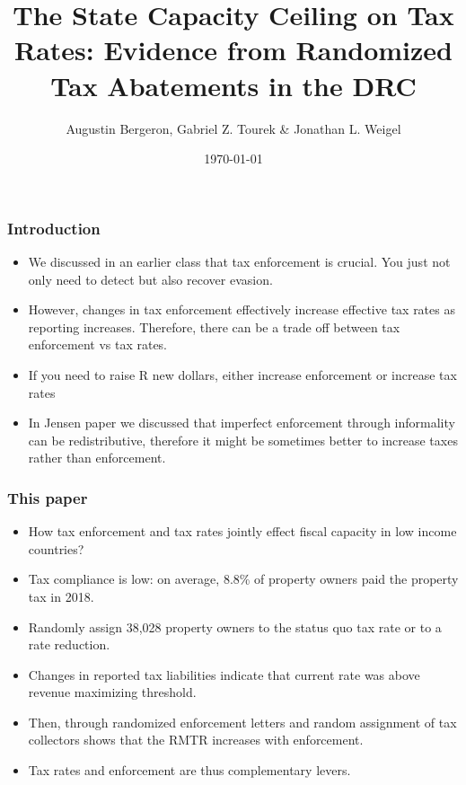 \documentclass{beamer}
\begin{document}
\title{The State Capacity Ceiling on Tax Rates: Evidence from Randomized Tax Abatements in the DRC}
\author{Augustin Bergeron, Gabriel Z. Tourek \& Jonathan L. Weigel}
\date{\today}

\frame{\titlepage}


\begin{frame}
\frametitle{Introduction}
\begin{itemize}
\item We discussed in an earlier class that tax enforcement is crucial. You just not only need to detect but also recover evasion. 
\item However, changes in tax enforcement effectively increase effective tax rates as reporting increases. Therefore, there can be a trade off between tax enforcement vs tax rates.
\item If you need to raise R new dollars, either increase enforcement or increase tax rates
\item In Jensen paper we discussed that imperfect enforcement through informality can be redistributive, therefore it might be sometimes better to increase taxes rather than enforcement.
\end{itemize}
\end{frame}

\begin{frame}
\frametitle{This paper}
\begin{itemize}
    \item How tax enforcement and tax rates jointly effect fiscal capacity in low income countries? 
    \item Tax compliance is low:  on average, 8.8\% of property owners paid the property tax in 2018.
    \item Randomly assign 38,028 property owners to the status quo tax rate or to a rate reduction.
    \item Changes in reported tax liabilities indicate that current rate was above revenue maximizing threshold. 
    \item Then, through randomized enforcement
letters and random assignment of tax collectors shows that the RMTR increases with enforcement. 
\item Tax rates and enforcement are thus complementary levers. 
  
\end{itemize}
\end{frame}
\end{document}
